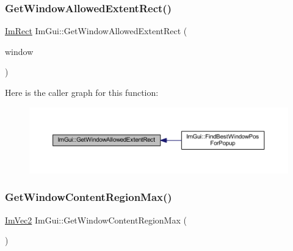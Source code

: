 \subsubsection{\texorpdfstring{Get\+Window\+Allowed\+Extent\+Rect()}{GetWindowAllowedExtentRect()}}
{\footnotesize\ttfamily \mbox{\hyperlink{struct_im_rect}{Im\+Rect}} Im\+Gui\+::\+Get\+Window\+Allowed\+Extent\+Rect (\begin{DoxyParamCaption}\item[{\mbox{\hyperlink{struct_im_gui_window}{Im\+Gui\+Window}} $\ast$}]{window }\end{DoxyParamCaption})}

Here is the caller graph for this function\+:
\nopagebreak
\begin{figure}[H]
\begin{center}
\leavevmode
\includegraphics[width=350pt]{namespace_im_gui_a4189cc4ec6ac56f3b21b29165d09ff98_icgraph}
\end{center}
\end{figure}
\mbox{\label{namespace_im_gui_a96ce6060592d3ef975594357e650adc6}} 
\subsubsection{\texorpdfstring{Get\+Window\+Content\+Region\+Max()}{GetWindowContentRegionMax()}}
{\footnotesize\ttfamily \mbox{\hyperlink{struct_im_vec2}{Im\+Vec2}} Im\+Gui\+::\+Get\+Window\+Content\+Region\+Max (\begin{DoxyParamCaption}{ }\end{DoxyParamCaption})}

